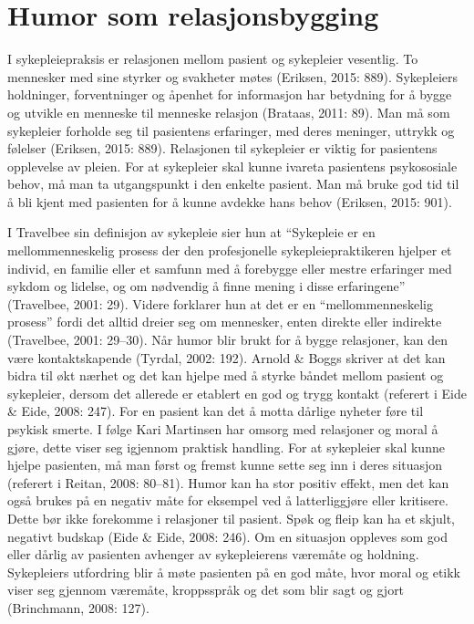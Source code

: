 \section{Humor som relasjonsbygging}

I sykepleiepraksis er relasjonen mellom pasient og sykepleier vesentlig. To
mennesker med sine styrker og svakheter møtes (Eriksen, 2015: 889). Sykepleiers
holdninger, forventninger og åpenhet for informasjon har betydning for å bygge
og utvikle en menneske til menneske relasjon (Brataas, 2011: 89). Man må som
sykepleier forholde seg til pasientens erfaringer, med deres meninger, uttrykk
og følelser (Eriksen, 2015: 889). Relasjonen til sykepleier er viktig for
pasientens opplevelse av pleien. For at sykepleier skal kunne ivareta
pasientens psykososiale behov, må man ta utgangspunkt i den enkelte pasient.
Man må bruke god tid til å bli kjent med pasienten for å kunne avdekke hans
behov (Eriksen, 2015: 901).

I Travelbee sin definisjon av sykepleie sier hun at “Sykepleie er en
mellommenneskelig prosess der den profesjonelle sykepleiepraktikeren hjelper et
individ, en familie eller et samfunn med å forebygge eller mestre erfaringer
med sykdom og lidelse, og om nødvendig å finne mening i disse erfaringene”
(Travelbee, 2001: 29). Videre forklarer hun at det er en “mellommenneskelig
prosess” fordi det alltid dreier seg om mennesker, enten direkte eller
indirekte (Travelbee, 2001: 29--30).  Når humor blir brukt for å bygge
relasjoner, kan den være kontaktskapende (Tyrdal, 2002: 192). Arnold \&{} Boggs
skriver at det kan bidra til økt nærhet og det kan hjelpe med å styrke båndet
mellom pasient og sykepleier, dersom det allerede er etablert en god og trygg
kontakt (referert i Eide \&{} Eide, 2008: 247).  For en pasient kan det å motta
dårlige nyheter føre til psykisk smerte. I følge Kari Martinsen har omsorg med
relasjoner og moral å gjøre, dette viser seg igjennom praktisk handling. For at
sykepleier skal kunne hjelpe pasienten, må man  først og fremst kunne sette seg
inn i deres situasjon (referert i Reitan, 2008: 80--81).  Humor kan ha stor
positiv effekt, men det kan også brukes på en negativ måte for eksempel ved å
latterliggjøre eller kritisere. Dette bør ikke forekomme i relasjoner til
pasient. Spøk og fleip kan ha et skjult, negativt budskap (Eide \&{} Eide, 2008:
246). Om en situasjon oppleves som god eller dårlig av pasienten avhenger av
sykepleierens væremåte og holdning. Sykepleiers utfordring blir å møte
pasienten på en god måte, hvor moral og etikk viser seg gjennom væremåte,
kroppsspråk og det som blir sagt og gjort (Brinchmann, 2008: 127).

